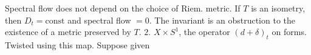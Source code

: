 Spectral flow does not depend on the choice of Riem. metric.
If $T$ is an isometry, then $D_t=\mathrm{const}$ and spectral flow $=0$.
The invariant is an obstruction to the existence of a metric preserved by $T$.
\textcircled{$2$}. $X\times S^1$, the operator $(d+\delta)_t$ on forms.
Twisted using this map.
Suppose given
\begin{center}\end{center}



